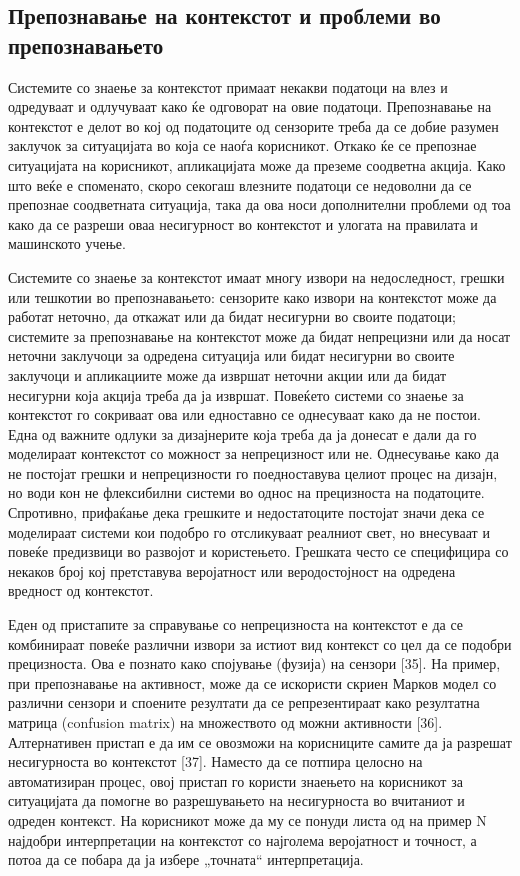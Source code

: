 \subsection{Препознавање на контекстот и проблеми во препознавањето}  

Системите со знаење за контекстот примаат некакви податоци на влез и одредуваат
и одлучуваат како ќе одговорат на овие податоци. Препознавање на контекстот е
делот во кој од податоците од сензорите треба да се добие разумен заклучок за
ситуацијата во која се наоѓа корисникот. Откако ќе се препознае ситуацијата на
корисникот, апликацијата може да преземе соодветна акција. Како што веќе е
споменато, скоро секогаш влезните податоци се недоволни да се препознае
соодветната ситуација, така да ова носи дополнителни проблеми од тоа како да се
разреши оваа несигурност во контекстот и улогата на правилата и машинското
учење.

Системите со знаење за контекстот имаат многу извори на недоследност, грешки или
тешкотии во препознавањето: сензорите како извори на контекстот може да работат
неточно, да откажат или да бидат несигурни во своите податоци; системите за
препознавање на контекстот може да бидат непрецизни или да носат неточни
заклучоци за одредена ситуација или бидат несигурни во своите заклучоци и
апликациите може да извршат неточни акции или да бидат несигурни која акција
треба да ја извршат. Повеќето системи со знаење за контекстот го сокриваат ова
или едноставно се однесуваат како да не постои. Една од важните одлуки за
дизајнерите која треба да ја донесат е дали да го моделираат контекстот со
можност за непрецизност или не. Однесување како да не постојат грешки и
непрецизности го поедноставува целиот процес на дизајн, но води кон не
флексибилни системи во однос на прецизноста на податоците. Спротивно, прифаќање
дека грешките и недостатоците постојат значи дека се моделираат системи кои
подобро го отсликуваат реалниот свет, но внесуваат и повеќе предизвици во
развојот и користењето. Грешката често се специфицира со некаков број кој
претставува веројатност или веродостојност на одредена вредност од контекстот.

Еден од пристапите за справување со непрецизноста на контекстот е да се
комбинираат повеќе различни извори за истиот вид контекст со цел да се подобри
прецизноста. Ова е познато како спојување (фузија) на сензори [35]. На пример,
при препознавање на активност, може да се искористи скриен Марков модел со
различни сензори и споените резултати да се репрезентираат како резултатна
матрица (confusion matrix) на множеството од можни активности [36]. Алтернативен
пристап е да им се овозможи на корисниците самите да ја разрешат несигурноста во
контекстот [37]. Наместо да се потпира целосно на автоматизиран процес, овој
пристап го користи знаењето на корисникот за ситуацијата да помогне во
разрешувањето на несигурноста во вчитаниот и одреден контекст. На корисникот
може да му се понуди листа од на пример N најдобри интерпретации на контекстот
со најголема веројатност и точност, а потоа да се побара да ја избере „точната“
интерпретација.

